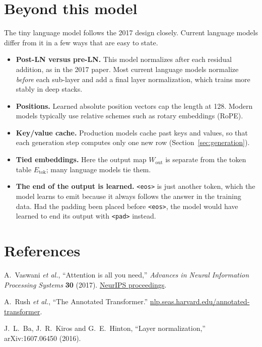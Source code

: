 \documentclass[11pt]{article}
\newcommand{\tok}[1]{\texttt{<#1>}}
\newcommand{\Etok}{E_{\text{tok}}}
\begin{document}
\section{Beyond this model}

The tiny language model follows the 2017 design closely. Current language models differ
from it in a few ways that are easy to state.
\begin{itemize}
\item \textbf{Post-LN versus pre-LN.} This model normalizes after each residual addition,
  as in the 2017 paper. Most current language models normalize \emph{before} each
  sub-layer and add a final layer normalization, which trains more stably in deep stacks.
\item \textbf{Positions.} Learned absolute position vectors cap the length at 128. Modern
  models typically use relative schemes such as rotary embeddings (RoPE).
\item \textbf{Key/value cache.} Production models cache past keys and values, so that each
  generation step computes only one new row (Section~\ref{sec:generation}).
\item \textbf{Tied embeddings.} Here the output map $W_{\text{out}}$ is separate from the
  token table $\Etok$; many language models tie them.
\item \textbf{The end of the output is learned.} \tok{eos} is just another token, which
  the model learns to emit because it always follows the answer in the training data.
  Had the padding been placed before \tok{eos}, the model would have learned to end its
  output with \tok{pad} instead.
\end{itemize}

\section*{References}
\begin{enumerate}[label={[\arabic*]}]
\item A.~Vaswani \emph{et al.}, ``Attention is all you need,'' \emph{Advances in Neural
  Information Processing Systems} \textbf{30} (2017).
  \href{https://papers.nips.cc/paper/2017/file/3f5ee243547dee91fbd053c1c4a845aa-Paper.pdf}{NeurIPS proceedings}.
\item A.~Rush \emph{et al.}, ``The Annotated Transformer.''
  \href{https://nlp.seas.harvard.edu/annotated-transformer/}{nlp.seas.harvard.edu/annotated-transformer}.
\item J.~L.~Ba, J.~R.~Kiros and G.~E.~Hinton, ``Layer normalization,''
  arXiv:1607.06450 (2016).
\end{enumerate}
\end{document}

